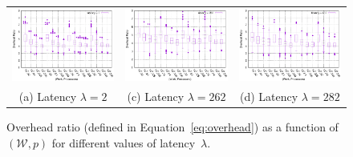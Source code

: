 \begin{figure}[ht]
  \centering
  \begin{tabular}{@{}c@{}c@{}c@{}}
    \includegraphics[width=0.33\linewidth]{figures/overheadratioWPinv2.eps}
    
    &\includegraphics[width=0.33\linewidth]{figures/overheadratioWPinv262.eps}
    &\includegraphics[width=0.33\linewidth]{figures/overheadratioWPinv482.eps}\\
    (a) Latency $\lambda=2$
    &(c) Latency $\lambda=262$&(d) Latency $\lambda=282$
    
  
  
  \end{tabular}
    
  \caption{Overhead ratio (defined in Equation~\eqref{eq:overhead}) as
    a function of $(\mathcal{W},p)$ for different values of
    latency~$\lambda$.}
  \label{fig:accuracy}
\end{figure}






